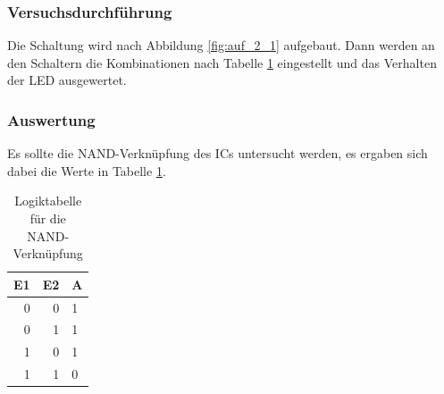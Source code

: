 \documentclass[12pt,a4paper]{article}
\begin{document}
\subsubsection*{Versuchsdurchführung}

Die Schaltung wird nach Abbildung \ref{fig:auf_2_1} aufgebaut. Dann werden an den Schaltern die Kombinationen nach Tabelle \ref{tab:2_1} eingestellt und das Verhalten der LED ausgewertet.

\subsubsection*{Auswertung}

Es sollte die NAND-Verknüpfung des ICs untersucht werden, es ergaben sich dabei die Werte in Tabelle \ref{tab:2_1}.

\begin{table}[H]
\begin{center}
\begin{tabular}{r|r|l}

\multicolumn{1}{l|}{E1} & \multicolumn{1}{l|}{E2} & A \\ \hline \hline
0 & 0 & 1 \\ 
0 & 1 & 1 \\ 
1 & 0 & 1 \\ 
1 & 1 & 0 \\ 
\end{tabular}
\end{center}
\caption{Logiktabelle für die NAND-Verknüpfung}
\label{tab:2_1}
\end{table}
\end{document}
